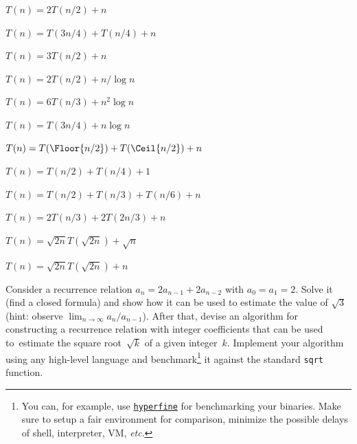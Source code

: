 \documentclass[a4paper,12pt]{article}
\begin{document}
\begin{tasks}
    \begin{multicols}{2}
    \begin{subtasks}
        \item $T(n) = 2T(n/2) + n$
        \item $T(n) = T(3n/4) + T(n/4) + n$
        \item $T(n) = 3T(n/2) + n$
        \item $T(n) = 2T(n/2) + n/\log n$
        \item $T(n) = 6T(n/3) + n^2 \log n$
        \item $T(n) = T(3n/4) + n \log n$
        \item $T(n) = T(\Floor{n/2}) + T(\Ceil{n/2}) + n$
        \item $T(n) = T(n/2) + T(n/4) + 1$
        \item $T(n) = T(n/2) + T(n/3) + T(n/6) + n$
        \item $T(n) = 2T(n/3) + 2T(2n/3) + n$
        \item $T(n) = \sqrt{2n} T(\sqrt{2n}) + \sqrt{n}$
        \item $T(n) = \sqrt{2n} T(\sqrt{2n}) + n$
    \end{subtasks}
    \end{multicols}


    \item Consider a recurrence relation $a_n = 2a_{n-1} + 2a_{n-2}$ with $a_0 = a_1 = 2$.
    Solve it (\ie find a closed formula) and show how it can be used to estimate the value of $\sqrt{3}$ (hint: observe $\lim_{n \to \infty} a_n / a_{n-1}$).
    After that, devise an algorithm for constructing a recurrence relation with integer coefficients that can be used to~estimate the square root~$\sqrt{k}$ of a given integer~$k$.
    Implement your algorithm using any high-level language and benchmark\footnote{You can, for example, use \href{https://github.com/sharkdp/hyperfine}{\texttt{hyperfine}} for benchmarking your binaries. Make sure to setup a fair environment for comparison, \ie minimize the possible delays of shell, interpreter, VM, \textit{etc}.} it against the standard \texttt{sqrt} function.

\end{tasks}
\end{document}
